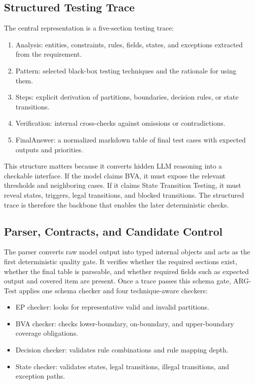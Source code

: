 \documentclass{article}
\renewcommand{\texttt}[1]{{\normalfont #1}}
\begin{document}
\subsection{Structured Testing Trace}
The central representation is a five-section testing trace:
\begin{enumerate}[leftmargin=1.5em]
\item \texttt{Analysis}: entities, constraints, rules, fields, states, and exceptions extracted from the requirement.
\item \texttt{Pattern}: selected black-box testing techniques and the rationale for using them.
\item \texttt{Steps}: explicit derivation of partitions, boundaries, decision rules, or state transitions.
\item \texttt{Verification}: internal cross-checks against omissions or contradictions.
\item \texttt{FinalAnswer}: a normalized markdown table of final test cases with expected outputs and priorities.
\end{enumerate}

This structure matters because it converts hidden LLM reasoning into a checkable interface. If the model claims BVA, it must expose the relevant thresholds and neighboring cases. If it claims State Transition Testing, it must reveal states, triggers, legal transitions, and blocked transitions. The structured trace is therefore the backbone that enables the later deterministic checks.

\subsection{Parser, Contracts, and Candidate Control}
The parser converts raw model output into typed internal objects and acts as the first deterministic quality gate. It verifies whether the required sections exist, whether the final table is parseable, and whether required fields such as expected output and covered item are present. Once a trace passes this schema gate, ARG-Test applies one schema checker and four technique-aware checkers:
\begin{itemize}[leftmargin=1.5em]
\item EP checker: looks for representative valid and invalid partitions.
\item BVA checker: checks lower-boundary, on-boundary, and upper-boundary coverage obligations.
\item Decision checker: validates rule combinations and rule mapping depth.
\item State checker: validates states, legal transitions, illegal transitions, and exception paths.
\end{itemize}
\end{document}
